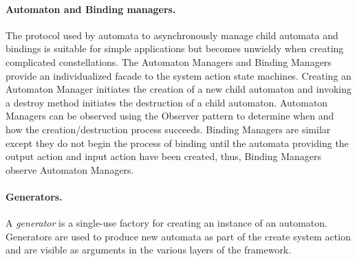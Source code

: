 \paragraph{Automaton and Binding managers.}
The protocol used by automata to asynchronously manage child automata and bindings is suitable for simple applications but becomes unwieldy when creating complicated constellations.
The Automaton Managers and Binding Managers provide an individualized facade to the system action state machines.
Creating an Automaton Manager initiates the creation of a new child automaton and invoking a destroy method initiates the destruction of a child automaton.
Automaton Managers can be observed using the Observer pattern to determine when and how the creation/destruction process succeeds.
Binding Managers are similar except they do not begin the process of binding until the automata providing the output action and input action have been created, thus, Binding Managers observe Automaton Managers.

\paragraph{Generators.}
A \emph{generator} is a single-use factory for creating an instance of an automaton.
Generators are used to produce new automata as part of the create system action and are visible as arguments in the various layers of the framework.
